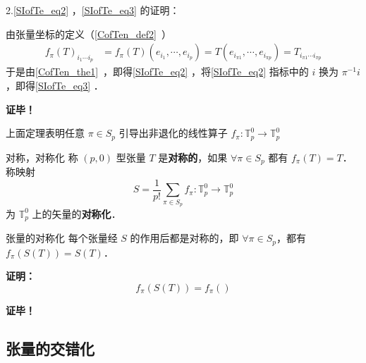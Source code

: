 2.\autoref{SIofTe_eq2} ，\autoref{SIofTe_eq3} 的证明：

由张量坐标的定义（\autoref{CofTen_def2}~）
\begin{equation}
\begin{aligned}
f_{\pi}(T)_{i_1\cdots i_p}&=f_{\pi}(T)(e_{i_1},\cdots,e_{i_p})=T(e_{i_{\pi1}},\cdots,e_{i_{\pi p}})=T_{i_{\pi1}\cdots i_{\pi p}}
\end{aligned}
\end{equation}
于是由\autoref{CofTen_the1}~，即得\autoref{SIofTe_eq2} ，将\autoref{SIofTe_eq2} 指标中的 $i$ 换为  $\pi^{-1} i$，即得\autoref{SIofTe_eq3} ．

\textbf{证毕！}

上面定理表明任意 $\pi \in S_p$ 引导出非退化的线性算子 $f_\pi:\mathbb{T}_p^0\rightarrow\mathbb{T}_p^0$ 

\begin{definition}{对称，对称化}
称 $(p,0)$ 型张量 $T$ 是\textbf{对称的}，如果 $\forall \pi\in S_p$ 都有 $f_{\pi}(T)=T$．称映射 
\begin{equation}
S=\frac{1}{p!}\sum_{\pi\in S_p} f_\pi:\mathbb{T}_p^0\rightarrow\mathbb{T}_p^0
\end{equation}
为 $\mathbb{T}_p^0$ 上的矢量的\textbf{对称化}．
\end{definition}

\begin{theorem}{张量的对称化}
每个张量经 $S$ 的作用后都是对称的，即 $\forall \pi\in S_p$，都有 $f_\pi(S(T))=S(T)$．
\end{theorem}
\textbf{证明：}
\begin{equation}
f_\pi(S(T))=f_\pi()
\end{equation}


\textbf{证毕！}
\subsection{张量的交错化}